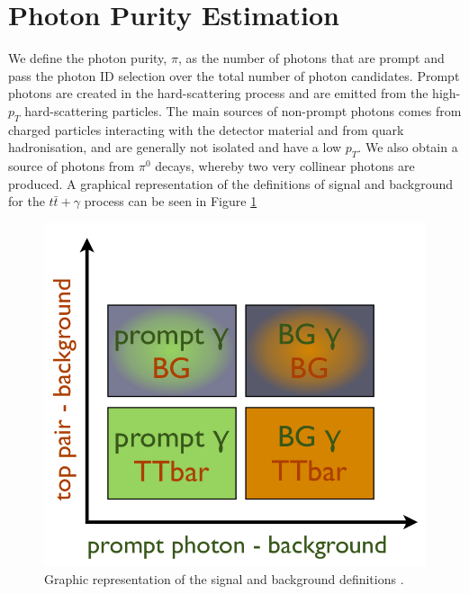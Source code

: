 

\section{Photon Purity Estimation} \label{sec-PhotonPurityEstimation}

We define the photon purity, $\pi$, as the number of photons that are prompt and pass the photon ID selection over the total number of photon candidates. Prompt photons are created in the hard-scattering process and are emitted from the high-$p_T$ hard-scattering particles. The main sources of non-prompt photons comes from charged particles interacting with the detector material and from quark hadronisation, and are generally not isolated and have a low $p_T$. We also obtain a source of photons from $\pi^0$ decays, whereby two very collinear photons are produced. A graphical representation of the definitions of signal and background for the $t\bar{t}+\gamma$ process can be seen in Figure \ref{fig-signalphotonplot}

\begin{figure} 
\begin{center}
\includegraphics[scale=0.33]{Figures/SignalPhotonPlot.png}
\end{center}
\caption{Graphic representation of the signal and background definitions \cite{MishaThesis}.}
\label{fig-signalphotonplot}
\end{figure} 


